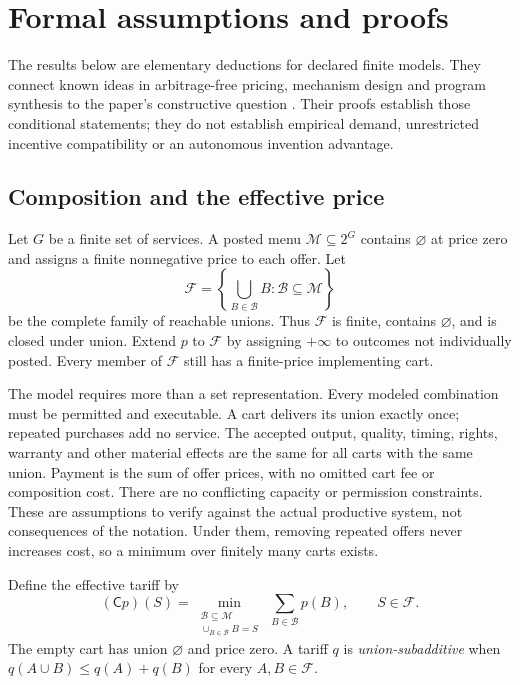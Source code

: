 \section{Formal assumptions and proofs}\label{app:proofs}

The results below are elementary deductions for declared finite models. They connect known ideas in arbitrage-free pricing, mechanism design and program synthesis to the paper's constructive question \cite{datapr,conitzer2002,synthesis,cegis}. Their proofs establish those conditional statements; they do not establish empirical demand, unrestricted incentive compatibility or an autonomous invention advantage.

\subsection{Composition and the effective price}\label{app:closure}

Let $G$ be a finite set of services. A posted menu $\mathcal M\subseteq 2^G$ contains $\varnothing$ at price zero and assigns a finite nonnegative price to each offer. Let
\[
\mathcal F=\left\{\bigcup_{B\in\mathcal B}B:\mathcal B\subseteq\mathcal M\right\}
\]
be the complete family of reachable unions. Thus $\mathcal F$ is finite, contains $\varnothing$, and is closed under union. Extend $p$ to $\mathcal F$ by assigning $+\infty$ to outcomes not individually posted. Every member of $\mathcal F$ still has a finite-price implementing cart.

The model requires more than a set representation. Every modeled combination must be permitted and executable. A cart delivers its union exactly once; repeated purchases add no service. The accepted output, quality, timing, rights, warranty and other material effects are the same for all carts with the same union. Payment is the sum of offer prices, with no omitted cart fee or composition cost. There are no conflicting capacity or permission constraints. These are assumptions to verify against the actual productive system, not consequences of the notation. Under them, removing repeated offers never increases cost, so a minimum over finitely many carts exists.

Define the effective tariff by
\begin{equation}
(\mathsf Cp)(S)=
\min_{\substack{\mathcal B\subseteq\mathcal M\\\cup_{B\in\mathcal B}B=S}}
\ \sum_{B\in\mathcal B}p(B),\qquad S\in\mathcal F.
\label{eq:appendix-closure}
\end{equation}
The empty cart has union $\varnothing$ and price zero. A tariff $q$ is \emph{union-subadditive} when $q(A\cup B)\le q(A)+q(B)$ for every $A,B\in\mathcal F$.

